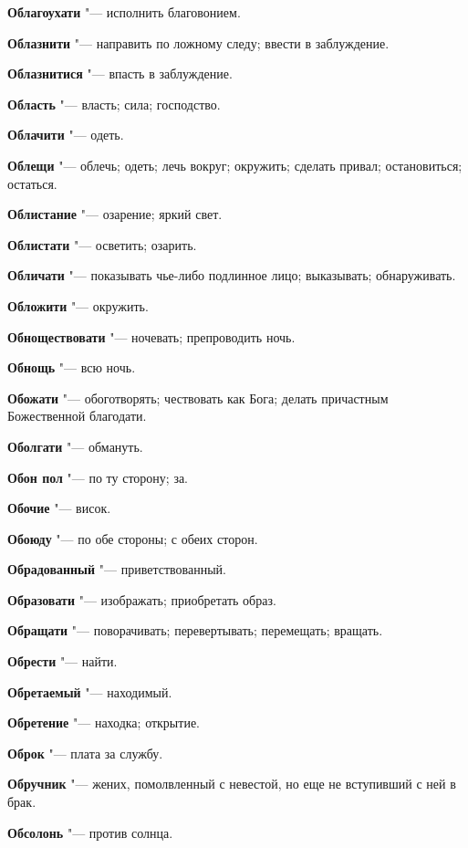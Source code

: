 \begin{mymulticols}
\noindent\textbf{Облагоухати} "--- исполнить благовонием. 

\noindent\textbf{Облазнити} "--- направить по ложному следу; ввести в заблуждение. 

\noindent\textbf{Облазнитися} "--- впасть в заблуждение. 

\noindent\textbf{Область} "--- власть; сила; господство. 

\noindent\textbf{Облачити} "--- одеть. 

\noindent\textbf{Облещи} "--- облечь; одеть; лечь вокруг; окружить; сделать привал; остановиться; остаться. 

\noindent\textbf{Облистание} "--- озарение; яркий свет. 

\noindent\textbf{Облистати} "--- осветить; озарить. 

\noindent\textbf{Обличати} "--- показывать чье-либо подлинное лицо; выказывать; обнаруживать. 

\noindent\textbf{Обложити} "--- окружить. 

\noindent\textbf{Обноществовати} "--- ночевать; препроводить ночь. 

\noindent\textbf{Обнощь} "--- всю ночь. 

\noindent\textbf{Обожати} "--- обоготворять; чествовать как Бога; делать причастным Божественной благодати. 

\noindent\textbf{Оболгати} "--- обмануть. 

\noindent\textbf{Обон пол} "--- по ту сторону; за. 

\noindent\textbf{Обочие} "--- висок. 

\noindent\textbf{Обоюду} "--- по обе стороны; с обеих сторон. 

\noindent\textbf{Обрадованный} "--- приветствованный. 

\noindent\textbf{Образовати} "--- изображать; приобретать образ. 

\noindent\textbf{Обращати} "--- поворачивать; перевертывать; перемещать; вращать. 

\noindent\textbf{Обрести} "--- найти. 

\noindent\textbf{Обретаемый} "--- находимый. 

\noindent\textbf{Обретение} "--- находка; открытие. 

\noindent\textbf{Оброк} "--- плата за службу. 

\noindent\textbf{Обручник} "--- жених, помолвленный с невестой, но еще не вступивший с ней в брак. 

\noindent\textbf{Обсолонь} "--- против солнца. 


\end{mymulticols}
